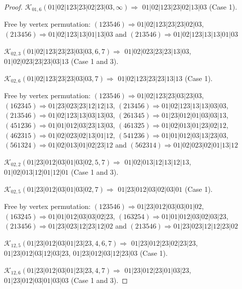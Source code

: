 \documentclass[12pt]{article}
\theoremstyle{plain}
\theoremstyle{definition}
\theoremstyle{remark}
\newcommand{\fancy}[1]{\mathcal{#1}}
\def\K{\fancy{K}}
\begin{document}
\begin{proof}
	$\K_{01,6}(01|02|123|23|02|23|03,\infty)\Rightarrow $ $01|02|123|23|02|13|03$ (Case 1).
	
	
	
	Free by vertex permutation: $(1 2 3 5 4 6)\Rightarrow 01|02|123|23|23|02|03$, $(2 1 3 4 5 6)\Rightarrow 01|02|123|13|01|13|03$ and $(2 1 3 5 4 6)\Rightarrow 01|02|123|13|13|01|03$
	
	
	
	\bigskip
	
	$\K_{02,3}(01|02|123|23|23|03|03,6, 7)\Rightarrow $ $01|02|023|23|23|13|03$, $01|02|023|23|23|03|13$ (Case 1 and 3).
	
	$\K_{02,6}(01|02|123|23|23|03|03,7)\Rightarrow $ $01|02|123|23|23|13|13$ (Case 1).
	
	
	
	Free by vertex permutation: $(1 2 3 5 4 6)\Rightarrow 01|02|123|23|03|23|03$, $(1 6 2 3 4 5)\Rightarrow 01|23|023|23|12|12|13$, $(2 1 3 4 5 6)\Rightarrow 01|02|123|13|13|03|03$, $(2 1 3 5 4 6)\Rightarrow 01|02|123|13|03|13|03$, $(2 6 1 3 4 5)\Rightarrow 01|23|012|01|03|03|13$, $(4 5 1 2 3 6)\Rightarrow 01|01|012|03|23|13|03$, $(4 6 1 3 2 5)\Rightarrow 01|02|013|01|23|02|12$, $(4 6 2 3 1 5)\Rightarrow 01|02|023|02|13|01|12$, $(5 4 1 2 3 6)\Rightarrow 01|01|012|03|13|23|03$, $(5 6 1 3 2 4)\Rightarrow 01|02|013|01|02|23|12$ and $(5 6 2 3 1 4)\Rightarrow 01|02|023|02|01|13|12$
	
	
	
	\bigskip
	
	$\K_{02,2}(01|23|012|03|01|03|02,5, 7)\Rightarrow $ $01|02|013|12|13|12|13$, $01|02|013|12|01|12|01$ (Case 1 and 3).
	
	$\K_{02,5}(01|23|012|03|01|03|02,7)\Rightarrow $ $01|23|012|03|02|03|01$ (Case 1).
	
	
	
	Free by vertex permutation: $(1 2 3 5 4 6)\Rightarrow 01|23|012|03|03|01|02$, $(1 6 3 2 4 5)\Rightarrow 01|01|012|03|03|02|23$, $(1 6 3 2 5 4)\Rightarrow 01|01|012|03|02|03|23$, $(2 1 3 4 5 6)\Rightarrow 01|23|023|12|23|12|02$ and $(2 1 3 5 4 6)\Rightarrow 01|23|023|12|12|23|02$
	
	
	
	\bigskip
	
	$\K_{12,5}(01|23|012|03|01|23|23,4, 6, 7)\Rightarrow $ $01|23|012|23|02|23|23$, $01|23|012|03|12|03|23$, $01|23|012|03|12|23|03$ (Case 1).
	
	$\K_{12,6}(01|23|012|03|01|23|23,4, 7)\Rightarrow $ $01|23|012|23|01|03|23$, $01|23|012|03|01|03|03$ (Case 1 and 3).
	

\end{proof}
\end{document}
